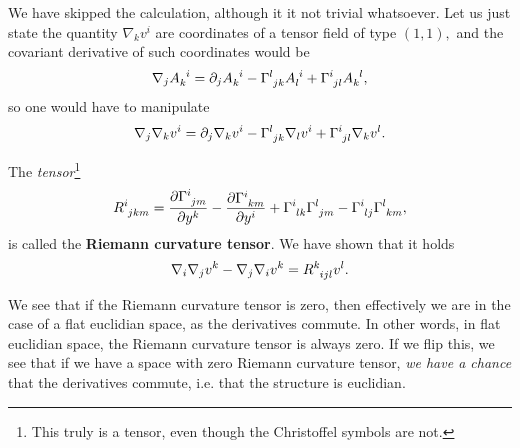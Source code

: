 \documentclass[../main.tex]{subfiles}
\begin{document}
We have skipped the calculation, although it it not trivial whatsoever. Let us just state the quantity $\nabla_k v^i$ are coordinates of a tensor field of type $(1,1),$ and the covariant derivative of such coordinates would be
\[
	\nabla_j A \indices{_k^i} = \partial_{j}A \indices{_k^i} - \Gamma \indices{^l_{jk}} A \indices{_l^i} + \Gamma \indices{^i_{jl}} A \indices{_k^l},
\]
so one would have to manipulate 
\[
	\nabla_j \nabla_k v^i = \partial_{j} \nabla_k v^i - \Gamma \indices{^l_{jk}} \nabla_l v^i + \Gamma \indices{^i_{jl}} \nabla_k v^l.
\]

\begin{definition}
	The \textit{tensor}\footnote{This truly is a tensor, even though the Christoffel symbols are not.}
    \begin{equation}
R \indices{^i_{jkm}}=\pdv{\Gamma \indices{^i_{jm}}}{y^k} - \pdv{\Gamma \indices{^i_{km}}}{y^i} + \Gamma \indices{^i_{lk}} \Gamma \indices{^l_{jm}}- \Gamma \indices{^i_{lj}} \Gamma \indices{^l_{km}},
    \end{equation}
    is called the \textbf{Riemann curvature tensor}. We have shown that it holds
    \[
	    \nabla_i \nabla_j v^k - \nabla_j \nabla_i v^k = R \indices{^k_{ijl}}v^l.
    \]
\end{definition}
We see that if the Riemann curvature tensor is zero, then effectively we are in the case of a flat euclidian space, as the derivatives commute.
In other words, in flat euclidian space, the Riemann curvature tensor is always zero. If we flip this, we see that if we have a space with zero Riemann curvature tensor, \textit{we have a chance} that the derivatives commute, i.e. that the structure is euclidian.
\end{document}

